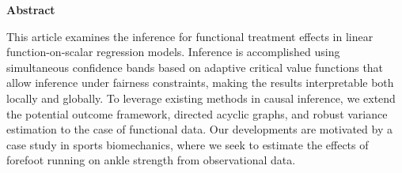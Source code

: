\begin{center}
    \textbf{Abstract}
\end{center}
This article examines the inference for functional treatment effects in linear
function-on-scalar regression models. Inference is accomplished using simultaneous
confidence bands based on adaptive critical value functions that allow inference under
fairness constraints, making the results interpretable both locally and globally. To
leverage existing methods in causal inference, we extend the potential outcome
framework, directed acyclic graphs, and robust variance estimation to the case of
functional data. Our developments are motivated by a case study in sports biomechanics,
where we seek to estimate the effects of forefoot running on ankle strength from
observational data.
